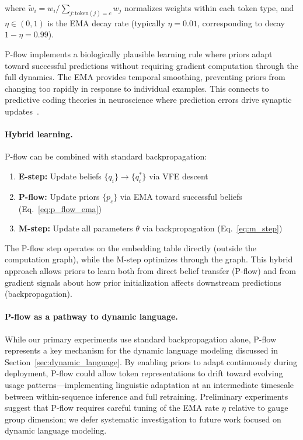 \documentclass[twoside,11pt]{article}
\begin{document}
where $\tilde{w}_i = w_i / \sum_{j : \text{token}(j) = c} w_j$ normalizes weights within each token type, and $\eta \in (0, 1)$ is the EMA decay rate (typically $\eta = 0.01$, corresponding to decay $1 - \eta = 0.99$).

P-flow implements a biologically plausible learning rule where priors adapt toward successful predictions without requiring gradient computation through the full dynamics. The EMA provides temporal smoothing, preventing priors from changing too rapidly in response to individual examples. This connects to predictive coding theories in neuroscience where prediction errors drive synaptic updates~\citep{rao1999predictive}.

\paragraph{Hybrid learning.} P-flow can be combined with standard backpropagation:
\begin{enumerate}
\item \textbf{E-step:} Update beliefs $\{q_i\} \to \{q_i^*\}$ via VFE descent
\item \textbf{P-flow:} Update priors $\{p_c\}$ via EMA toward successful beliefs (Eq.~\ref{eq:p_flow_ema})
\item \textbf{M-step:} Update all parameters $\theta$ via backpropagation (Eq.~\ref{eq:m_step})
\end{enumerate}

The P-flow step operates on the embedding table directly (outside the computation graph), while the M-step optimizes through the graph. This hybrid approach allows priors to learn both from direct belief transfer (P-flow) and from gradient signals about how prior initialization affects downstream predictions (backpropagation).

\paragraph{P-flow as a pathway to dynamic language.} While our primary experiments use standard backpropagation alone, P-flow represents a key mechanism for the dynamic language modeling discussed in Section~\ref{sec:dynamic_language}. By enabling priors to adapt continuously during deployment, P-flow could allow token representations to drift toward evolving usage patterns---implementing linguistic adaptation at an intermediate timescale between within-sequence inference and full retraining. Preliminary experiments suggest that P-flow requires careful tuning of the EMA rate $\eta$ relative to gauge group dimension; we defer systematic investigation to future work focused on dynamic language modeling.
\end{document}
